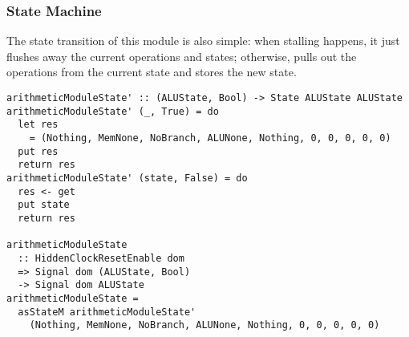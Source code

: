 \subsubsection{State Machine}
The state transition of this module is also simple: when stalling happens, it just flushes away the current operations and states; otherwise, pulls out the operations from the current state and stores the new state.
\begin{verbatim}
arithmeticModuleState' :: (ALUState, Bool) -> State ALUState ALUState
arithmeticModuleState' (_, True) = do
  let res
    = (Nothing, MemNone, NoBranch, ALUNone, Nothing, 0, 0, 0, 0, 0)
  put res
  return res
arithmeticModuleState' (state, False) = do
  res <- get
  put state
  return res

arithmeticModuleState 
  :: HiddenClockResetEnable dom
  => Signal dom (ALUState, Bool)
  -> Signal dom ALUState
arithmeticModuleState =
  asStateM arithmeticModuleState' 
    (Nothing, MemNone, NoBranch, ALUNone, Nothing, 0, 0, 0, 0, 0)
\end{verbatim}
